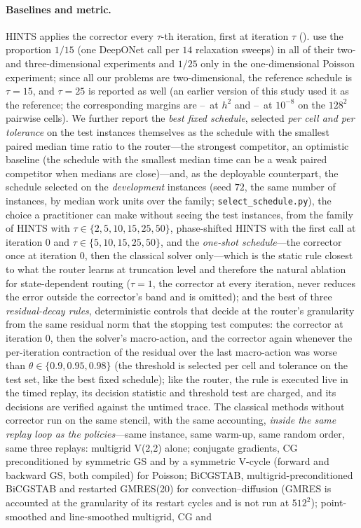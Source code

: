 \paragraph{Baselines and metric.} HINTS applies the corrector every $\tau$-th iteration, first at iteration $\tau$ (). \citet{zhang2024blending} use the proportion $1/15$ (one DeepONet call per $14$ relaxation sweeps) in all of their two- and three-dimensional experiments and $1/25$ only in the one-dimensional Poisson experiment; since all our problems are two-dimensional, the reference schedule is $\tau = 15$, and $\tau = 25$ is reported as well (an earlier version of this study used it as the reference; the corresponding margins are \caSpHintsTFMin--\caSpHintsTFMax\ at $h^2$ and \caSpHintsTFDeepMin--\caSpHintsTFDeepMax\ at $10^{-8}$ on the $128^2$ pairwise cells). We further report the \emph{best fixed schedule}, selected \emph{per cell and per tolerance} on the test instances themselves as the schedule with the smallest paired median time ratio to the router---the strongest competitor, an optimistic baseline (the schedule with the smallest median time can be a weak paired competitor when medians are close)---and, as the deployable counterpart, the schedule selected on the \emph{development} instances (seed $72$, the same number of instances, by median work units over the family; \texttt{select\_schedule.py}), the choice a practitioner can make without seeing the test instances, from the family of HINTS with $\tau \in \{2, 5, 10, 15, 25, 50\}$, phase-shifted HINTS with the first call at iteration $0$ and $\tau \in \{5, 10, 15, 25, 50\}$, and the \emph{one-shot schedule}---the corrector once at iteration $0$, then the classical solver only---which is the static rule closest to what the router learns at truncation level and therefore the natural ablation for state-dependent routing ($\tau = 1$, the corrector at every iteration, never reduces the error outside the corrector's band and is omitted); and the best of three \emph{residual-decay rules}, deterministic controls that decide at the router's granularity from the same residual norm that the stopping test computes: the corrector at iteration $0$, then the solver's macro-action, and the corrector again whenever the per-iteration contraction of the residual over the last macro-action was worse than $\theta \in \{0.9, 0.95, 0.98\}$ (the threshold is selected per cell and tolerance on the test set, like the best fixed schedule); like the router, the rule is executed live in the timed replay, its decision statistic and threshold test are charged, and its decisions are verified against the untimed trace. The classical methods without corrector run on the same stencil, with the same accounting, \emph{inside the same replay loop as the policies}---same instance, same warm-up, same random order, same three replays: multigrid V(2,2) alone; conjugate gradients, CG preconditioned by symmetric GS and by a symmetric V-cycle (forward and backward GS, both compiled) for Poisson; BiCGSTAB, multigrid-preconditioned BiCGSTAB and restarted GMRES(20) for convection--diffusion (GMRES is accounted at the granularity of its restart cycles and is not run at $512^2$); point-smoothed and line-smoothed multigrid, CG and 